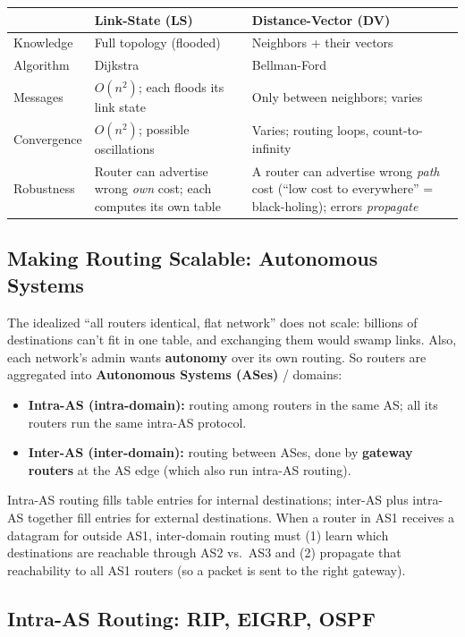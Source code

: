 \documentclass[hidelinks]{article}
\begin{document}
\renewcommand{\arraystretch}{1.3}
\noindent\begin{tabularx}{\textwidth}{|l|X|X|}
\hline
 & \textbf{Link-State (LS)} & \textbf{Distance-Vector (DV)} \\
\hline
Knowledge & Full topology (flooded) & Neighbors + their vectors \\
\hline
Algorithm & Dijkstra & Bellman-Ford \\
\hline
Messages & $O(n^2)$; each floods its link state & Only between neighbors; varies \\
\hline
Convergence & $O(n^2)$; possible oscillations & Varies; routing loops, count-to-infinity \\
\hline
Robustness & Router can advertise wrong \emph{own} cost; each computes its own table & A router can advertise wrong \emph{path} cost (``low cost to everywhere'' = black-holing); errors \emph{propagate} \\
\hline
\end{tabularx}

\subsection{Making Routing Scalable: Autonomous Systems}

The idealized ``all routers identical, flat network'' does not scale: billions
of destinations can't fit in one table, and exchanging them would swamp links.
Also, each network's admin wants \textbf{autonomy} over its own routing. So
routers are aggregated into \textbf{Autonomous Systems (ASes)} / domains:
\begin{itemize}
    \item \textbf{Intra-AS (intra-domain):} routing among routers in the same
    AS; all its routers run the same intra-AS protocol.
    \item \textbf{Inter-AS (inter-domain):} routing between ASes, done by
    \textbf{gateway routers} at the AS edge (which also run intra-AS routing).
\end{itemize}
Intra-AS routing fills table entries for internal destinations; inter-AS plus
intra-AS together fill entries for external destinations. When a router in AS1
receives a datagram for outside AS1, inter-domain routing must (1) learn which
destinations are reachable through AS2 vs.\ AS3 and (2) propagate that
reachability to all AS1 routers (so a packet is sent to the right gateway).

\subsection{Intra-AS Routing: RIP, EIGRP, OSPF}
\end{document}
